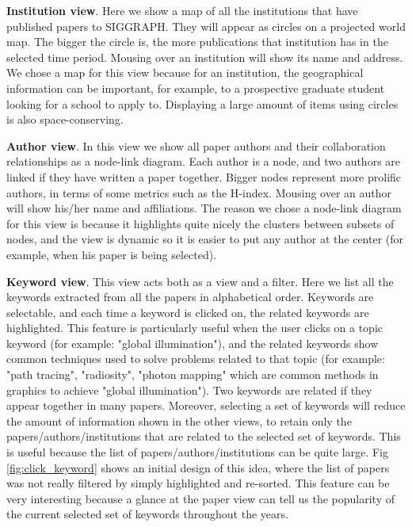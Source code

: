 \documentclass[dvips,12pt]{article}
\begin{document}
\textbf{Institution view}. Here we show a map of all the institutions that have published papers to SIGGRAPH. They will appear as circles on a projected world map. The bigger the circle is, the more publications that institution has in the selected time period. Mousing over an institution will show its name and address. We chose a map for this view because for an institution, the geographical information can be important, for example, to a prospective graduate student looking for a school to apply to. Displaying a large amount of items using circles is also space-conserving.

\textbf{Author view}. In this view we show all paper authors and their collaboration relationships as a node-link diagram. Each author is a node, and two authors are linked if they have written a paper together. Bigger nodes represent more prolific authors, in terms of some metrics such as the H-index. Mousing over an author will show his/her name and affiliations. The reason we chose a node-link diagram for this view is because it highlights quite nicely the clusters between subsets of nodes, and the view is dynamic so it is easier to put any author at the center (for example, when his paper is being selected).

\textbf{Keyword view}. This view acts both as a view and a filter. Here we list all the keywords extracted from all the papers in alphabetical order. Keywords are selectable, and each time a keyword is clicked on, the related keywords are highlighted. This feature is particularly useful when the user clicks on a topic keyword (for example: "global illumination"), and the related keywords show common techniques used to solve problems related to that topic (for example: "path tracing", "radiosity", "photon mapping" which are common methods in graphics to achieve "global illumination"). Two keywords are related if they appear together in many papers. Moreover, selecting a set of keywords will reduce the amount of information shown in the other views, to retain only the papers/authors/institutions that are related to the selected set of keywords. This is useful because the list of papers/authors/institutions can be quite large. Fig \ref{fig:click_keyword} shows an initial design of this idea, where the list of papers was not really filtered by simply highlighted and re-sorted. This feature can be very interesting because a glance at the paper view can tell us the popularity of the current selected set of keywords throughout the years.
\end{document}
